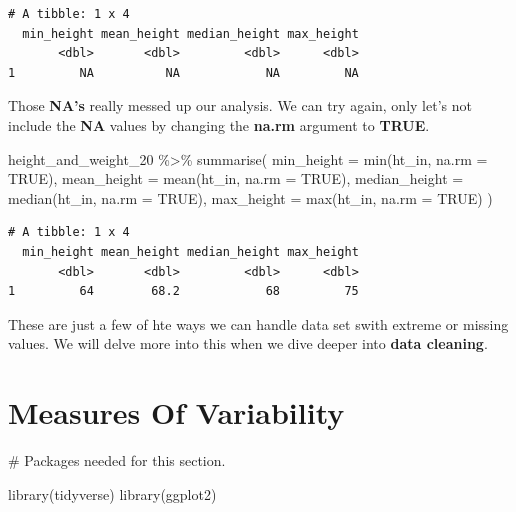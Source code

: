 \documentclass[
  letterpaper,
  DIV=11,
  numbers=noendperiod]{scrreprt}
\newenvironment{Shaded}{\begin{snugshade}}{\end{snugshade}}
\newcommand{\AttributeTok}[1]{\textcolor[rgb]{0.40,0.45,0.13}{#1}}
\newcommand{\CommentTok}[1]{\textcolor[rgb]{0.37,0.37,0.37}{#1}}
\newcommand{\ConstantTok}[1]{\textcolor[rgb]{0.56,0.35,0.01}{#1}}
\newcommand{\FunctionTok}[1]{\textcolor[rgb]{0.28,0.35,0.67}{#1}}
\newcommand{\NormalTok}[1]{\textcolor[rgb]{0.00,0.23,0.31}{#1}}
\newcommand{\SpecialCharTok}[1]{\textcolor[rgb]{0.37,0.37,0.37}{#1}}
\begin{document}
\begin{verbatim}
# A tibble: 1 x 4
  min_height mean_height median_height max_height
       <dbl>       <dbl>         <dbl>      <dbl>
1         NA          NA            NA         NA
\end{verbatim}

Those \textbf{NA's} really messed up our analysis. We can try again,
only let's not include the \textbf{NA} values by changing the
\textbf{na.rm} argument to \textbf{TRUE}.

\begin{Shaded}
\begin{Highlighting}[]
\NormalTok{height\_and\_weight\_20 }\SpecialCharTok{\%\textgreater{}\%} 
  \FunctionTok{summarise}\NormalTok{(}
    \AttributeTok{min\_height    =} \FunctionTok{min}\NormalTok{(ht\_in, }\AttributeTok{na.rm =} \ConstantTok{TRUE}\NormalTok{),}
    \AttributeTok{mean\_height   =} \FunctionTok{mean}\NormalTok{(ht\_in, }\AttributeTok{na.rm =} \ConstantTok{TRUE}\NormalTok{),}
    \AttributeTok{median\_height =} \FunctionTok{median}\NormalTok{(ht\_in, }\AttributeTok{na.rm =} \ConstantTok{TRUE}\NormalTok{),}
    \AttributeTok{max\_height    =} \FunctionTok{max}\NormalTok{(ht\_in, }\AttributeTok{na.rm =} \ConstantTok{TRUE}\NormalTok{)}
\NormalTok{  )}
\end{Highlighting}
\end{Shaded}

\begin{verbatim}
# A tibble: 1 x 4
  min_height mean_height median_height max_height
       <dbl>       <dbl>         <dbl>      <dbl>
1         64        68.2            68         75
\end{verbatim}

These are just a few of hte ways we can handle data set swith extreme or
missing values. We will delve more into this when we dive deeper into
\textbf{data cleaning}.


\chapter*{Measures Of Variability}\label{measures-of-variability}


\begin{Shaded}
\begin{Highlighting}[]
\CommentTok{\# Packages needed for this section.}

\FunctionTok{library}\NormalTok{(tidyverse)}
\FunctionTok{library}\NormalTok{(ggplot2)}
\end{Highlighting}
\end{Shaded}
\end{document}
